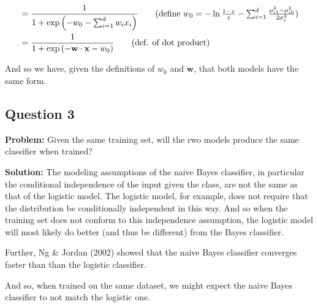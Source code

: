 \documentclass{article}
\renewcommand{\vec}[1]{\mathbf{#1}}
\newcommand{\cond}{\,|\,}
\begin{document}
\begin{align*}
  &=\frac{1}{1+\exp\left(-w_0-\sum_{i=1}^dw_ix_i\right)}\tag{define $w_0=-\ln\frac{1-z}{z}-\sum_{i=1}^d\frac{\mu_{i1}^2-\mu_{i0}^2}{2\sigma_i^2}$}\\
  &=\frac{1}{1+\exp\left(-\vec w\cdot\vec x-w_0\right)}\tag{def. of dot product}
\end{align*}

And so we have, given the definitions of $w_0$ and $\vec w$, that both models have the same form.

\subsection*{Question 3}
\noindent\textbf{Problem:} Given the same training set, will the rwo models produce the same classifier when trained?
\bigskip

\noindent\textbf{Solution:} The modeling assumptions of the naive Bayes classifier, in particular the conditional independence of the input given the class, are not the same as that of the logistic model. The logistic model, for example, does not require that the distribution be conditionally independent in this way. And so when the training set does not conform to this independence assumption, the logistic model will most likely do better (and thus be different) from the Bayes classifier.

Further, Ng \& Jordan (2002) showed that the naive Bayes classifier converges faster than than the logistic classifier.

And so, when trained on the same dataset, we might expect the naive Bayes classifier to not match the logistic one.

\end{document}
